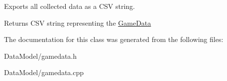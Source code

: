 Exports all collected data as a C\+S\+V string. 

\begin{DoxyReturn}{Returns}
C\+S\+V string representing the \hyperlink{class_game_data}{Game\+Data} 
\end{DoxyReturn}


The documentation for this class was generated from the following files\+:\begin{DoxyCompactItemize}
\item 
Data\+Model/gamedata.\+h\item 
Data\+Model/gamedata.\+cpp\end{DoxyCompactItemize}
